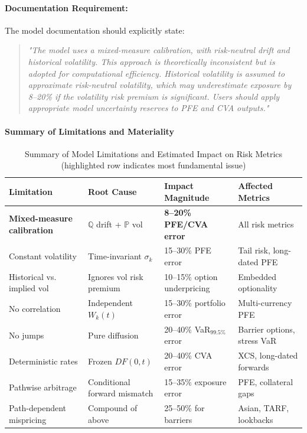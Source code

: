 \paragraph{Documentation Requirement:}

The model documentation should explicitly state:
\begin{quote}
	\textit{"The model uses a mixed-measure calibration, with risk-neutral drift and historical volatility. This approach is theoretically inconsistent but is adopted for computational efficiency. Historical volatility is assumed to approximate risk-neutral volatility, which may underestimate exposure by 8--20\% if the volatility risk premium is significant. Users should apply appropriate model uncertainty reserves to PFE and CVA outputs."}
\end{quote}

\newpage 


\paragraph{Summary of Limitations and Materiality}

\begin{table}[h!]
	\centering
	\small
	\begin{tabular}{|p{4cm}|p{3.5cm}|p{3cm}|p{3cm}|}
		\hline
		\textbf{Limitation} & \textbf{Root Cause} & \textbf{Impact Magnitude} & \textbf{Affected Metrics} \\
		\hline
		\rowcolor{yellow!30}
		\textbf{Mixed-measure calibration} & $\mathbb{Q}$ drift + $\mathbb{P}$ vol & \textbf{8--20\% PFE/CVA error} & All risk metrics \\
		\hline
		Constant volatility & Time-invariant $\sigma_k$ & 15--30\% PFE error & Tail risk, long-dated PFE \\
		\hline
		Historical vs. implied vol & Ignores vol risk premium & 10--15\% option underpricing & Embedded optionality \\
		\hline
		No correlation & Independent $W_k(t)$ & 15--30\% portfolio error & Multi-currency PFE \\
		\hline
		No jumps & Pure diffusion & 20--40\% VaR$_{99.5\%}$ error & Barrier options, stress VaR \\
		\hline
		Deterministic rates & Frozen $DF(0,t)$ & 20--40\% CVA error & XCS, long-dated forwards \\
		\hline
		Pathwise arbitrage & Conditional forward mismatch & 15--35\% exposure error & PFE, collateral gaps \\
		\hline
		Path-dependent mispricing & Compound of above & 25--50\% for barriers & Asian, TARF, lookbacks \\
		\hline
	\end{tabular}
	\caption{Summary of Model Limitations and Estimated Impact on Risk Metrics (highlighted row indicates most fundamental issue)}
	\label{tab:limitations_summary}
\end{table}
\newpage


